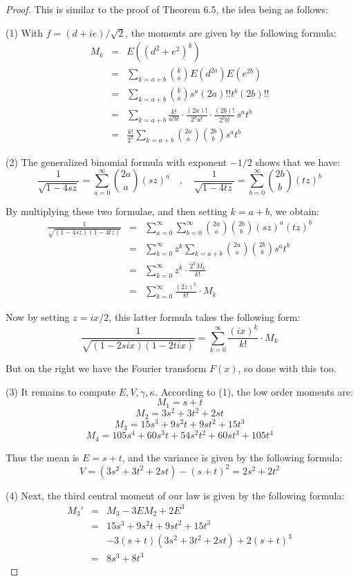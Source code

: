 \documentclass[12pt]{amsbook}
\begin{document}
\begin{proof}
This is similar to the proof of Theorem 6.5, the idea being as follows:

\medskip

(1) With $f=(d+ie)/\sqrt{2}$, the moments are given by the following formula:
\begin{eqnarray*}
M_k
&=&E\left((d^2+e^2)^k\right)\\
&=&\sum_{k=a+b}\binom{k}{a}E(d^{2a})E(e^{2b})\\
&=&\sum_{k=a+b}\binom{k}{a}s^a(2a)!!t^b(2b)!!\\
&=&\sum_{k=a+b}\frac{k!}{a!b!}\cdot\frac{(2a)!}{2^aa!}\cdot\frac{(2b)!}{2^bb!}\,s^at^b\\
&=&\frac{k!}{2^k}\sum_{k=a+b}\binom{2a}{a}\binom{2b}{b}s^at^b
\end{eqnarray*}

(2) The generalized binomial formula with exponent $-1/2$ shows that we have:
$$\frac{1}{\sqrt{1-4sz}}=\sum_{a=0}^\infty\binom{2a}{a}(sz)^a
\quad,\quad\frac{1}{\sqrt{1-4tz}}=\sum_{b=0}^\infty\binom{2b}{b}(tz)^b$$

By multiplying these two formulae, and then setting $k=a+b$, we obtain:
\begin{eqnarray*}
\frac{1}{\sqrt{(1-4sz)(1-4tz)}}
&=&\sum_{a=0}^\infty\sum_{b=0}^\infty\binom{2a}{a}\binom{2b}{b}(sz)^a(tz)^b\\
&=&\sum_{k=0}^\infty z^k\sum_{k=a+b}\binom{2a}{a}\binom{2b}{b}s^at^b\\
&=&\sum_{k=0}^\infty z^k\cdot\frac{2^kM_k}{k!}\\
&=&\sum_{k=0}^\infty\frac{(2z)^k}{k!}\cdot M_k
\end{eqnarray*}

Now by setting $z=ix/2$, this latter formula takes the following form:
$$\frac{1}{\sqrt{(1-2six)(1-2tix)}}=\sum_{k=0}^\infty\frac{(ix)^k}{k!}\cdot M_k$$

But on the right we have the Fourier transform $F(x)$, so done with this too.

\medskip

(3) It remains to compute $E,V,\gamma,\kappa$. According to (1), the low order moments are:
$$M_1=s+t$$
$$M_2=3s^2+3t^2+2st$$
$$M_3=15s^3+9s^2t+9st^2+15t^3$$
$$M_4=105s^4+60s^3t+54s^2t^2+60st^3+105t^4$$

Thus the mean is $E=s+t$, and the variance is given by the following formula:
$$V=(3s^2+3t^2+2st)-(s+t)^2=2s^2+2t^2$$

(4) Next, the third central moment of our law is given by the following formula:
\begin{eqnarray*}
M_3'
&=&M_3-3EM_2+2E^3\\
&=&15s^3+9s^2t+9st^2+15t^3\\
&&-3(s+t)(3s^2+3t^2+2st)+2(s+t)^3\\
&=&8s^3+8t^3
\end{eqnarray*} 


\end{proof}
\end{document}
